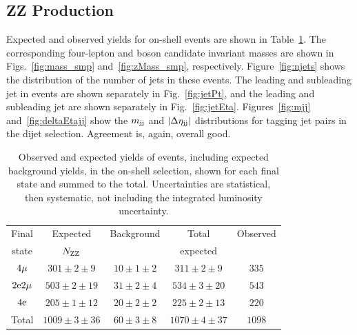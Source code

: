 \subsection{ZZ Production}

Expected and observed yields for on-shell {\ZZ} events are shown in Table~\ref{tab:results_zz}.
The corresponding four-lepton and {\PZ} boson candidate invariant masses are shown in Figs.~\ref{fig:mass_smp} and~\ref{fig:zMass_smp}, respectively.
Figure~\ref{fig:njets} shows the distribution of the number of jets in these events.
The leading and subleading jet {\pt} in {\ZZ} events are shown separately in Fig.~\ref{fig:jetPt}, and the leading and subleading jet {\abseta} are shown separately in Fig.~\ref{fig:jetEta}.
Figures~\ref{fig:mjj} and~\ref{fig:deltaEtajj} show the $m_{\mathrm{j}\mathrm{j}}$ and $\lvert \Delta \eta_{\mathrm{j}\mathrm{j}} \rvert$ distributions for tagging jet pairs in the dijet selection.
Agreement is, again, overall good.

\begin{table}[htbp]
  \begin{center}
    \caption[Expected and observed yields for doubly-resonant {\ZZ} production.]{
      Observed and expected yields of {\ZZ} events, including expected background yields, in the on-shell selection, shown for each final state and summed to the total.
      Uncertainties are statistical, then systematic, not including the integrated luminosity uncertainty.
    }\label{tab:results_zz}
    \begin{tabular}{ccccc}
      \toprule
      Final & Expected   &  Background   & Total     & Observed \\
      state & $N_{\mathrm{Z}\mathrm{Z}}$  &               & expected  &          \\
      \midrule
      \midrule
      $4\mathrm{\mu}$       & $ 301 \pm 2 \pm 9     $  & $ 10 \pm 1 \pm 2   $  & $ 311 \pm 2 \pm 9     $  & $ 335 $   \\
      $2\mathrm{e} 2\mathrm{\mu}$  & $ 503 \pm 2 \pm 19    $  & $ 31 \pm 2 \pm 4   $  & $ 534 \pm 3 \pm 20    $  & $ 543 $   \\
      $4\mathrm{e}$       & $ 205 \pm 1 \pm 12    $  & $ 20 \pm 2 \pm 2   $  & $ 225 \pm 2 \pm 13    $  & $ 220 $   \\
      \midrule
      Total        & $ 1009  \pm 3  \pm 36 $  & $ 60  \pm 3  \pm 8 $  & $ 1070  \pm 4  \pm 37 $  & $ 1098 $  \\
      \bottomrule
    \end{tabular}
  \end{center}
\end{table}

